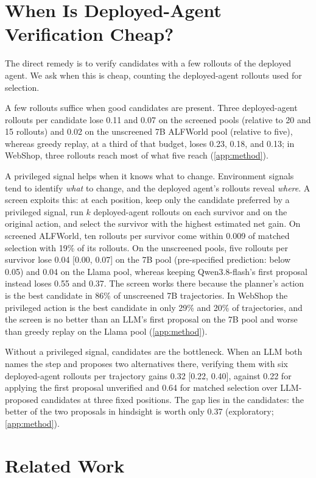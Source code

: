 \documentclass{article}
\theoremstyle{plain}
\theoremstyle{definition}
\theoremstyle{remark}
\begin{document}
\section{When Is Deployed-Agent Verification Cheap?}
\label{sec:method}

The direct remedy is to verify candidates with a few rollouts of the deployed agent. We ask when this is cheap, counting the deployed-agent rollouts used for selection.

A few rollouts suffice when good candidates are present.
Three deployed-agent rollouts per candidate lose 0.11 and 0.07 on the screened pools (relative to 20 and 15 rollouts) and 0.02 on the unscreened 7B ALFWorld pool (relative to five), whereas greedy replay, at a third of that budget, loses 0.23, 0.18, and 0.13; in WebShop, three rollouts reach most of what five reach (\cref{app:method}).

A privileged signal helps when it knows what to change.
Environment signals tend to identify \emph{what} to change, and the deployed agent's rollouts reveal \emph{where}. A screen exploits this: at each position, keep only the candidate preferred by a privileged signal, run $k$ deployed-agent rollouts on each survivor and on the original action, and select the survivor with the highest estimated net gain. On screened ALFWorld, ten rollouts per survivor come within 0.009 of matched selection with 19\% of its rollouts. On the unscreened pools, five rollouts per survivor lose 0.04 [0.00, 0.07] on the 7B pool (pre-specified prediction: below 0.05) and 0.04 on the Llama pool, whereas keeping Qwen3.8-flash's first proposal instead loses 0.55 and 0.37. The screen works there because the planner's action is the best candidate in 86\% of unscreened 7B trajectories. In WebShop the privileged action is the best candidate in only 29\% and 20\% of trajectories, and the screen is no better than an LLM's first proposal on the 7B pool and worse than greedy replay on the Llama pool (\cref{app:method}).

Without a privileged signal, candidates are the bottleneck.
When an LLM both names the step and proposes two alternatives there, verifying them with six deployed-agent rollouts per trajectory gains 0.32 [0.22, 0.40], against 0.22 for applying the first proposal unverified and 0.64 for matched selection over LLM-proposed candidates at three fixed positions. The gap lies in the candidates: the better of the two proposals in hindsight is worth only 0.37 (exploratory; \cref{app:method}).

\section{Related Work}
\label{sec:related}
\end{document}
